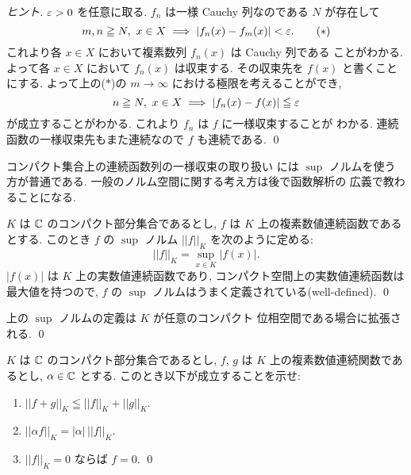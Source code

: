 \documentclass[12pt,twoside]{jarticle}
\begin{document}
\begin{proof}[ヒント]
 $\varepsilon>0$ を任意に取る.
 $f_n$ は一様 Cauchy 列なのである $N$ が存在して 
 \begin{equation*}
  m,n\geqq N,\ x\in X \implies |f_n(x)-f_m(x)|<\varepsilon.
  \tag{$*$}
 \end{equation*}
 これより各 $x\in X$ において複素数列 $f_n(x)$ は Cauchy 列である
 ことがわかる. よって各 $x\in X$ において $f_n(x)$ は収束する.
 その収束先を $f(x)$ と書くことにする.
 よって上の($*$)の $m\to\infty$ における極限を考えることができ, 
 \begin{equation*}
  n\geqq N,\ x\in X \implies |f_n(x)-f(x)|\leqq\eps
 \end{equation*}
 が成立することがわかる. これより $f_n$ は $f$ に一様収束することが
 わかる. 連続函数の一様収束先もまた連続なので $f$ も連続である.
 \qed
\end{proof}

コンパクト集合上の連続函数列の一様収束の取り扱い
には $\sup$ ノルムを使う方が普通である.  
一般のノルム空間に関する考え方は後で函数解析の
広義で教わることになる. 

\begin{definition}
 $K$ は ${\mathbb C}$ のコンパクト部分集合であるとし, 
 $f$ は $K$ 上の複素数値連続函数であるとする.
 このとき $f$ の $\sup$ ノルム $||f||_K$ を次のように定める:
 \begin{equation*}
  ||f||_K = \sup_{x\in K} |f(x)|.
 \end{equation*}
 $|f(x)|$ は $K$ 上の実数値連続函数であり, 
 コンパクト空間上の実数値連続函数は最大値を持つので, %
 $f$ の $\sup$ ノルムはうまく定義されている(well-defined).
 \qed
\end{definition}

\begin{rem}[位相空間について知っている人へ]
 上の $\sup$ ノルムの定義は $K$ が任意のコンパクト
 位相空間である場合に拡張される. \qed
\end{rem}

\begin{question}
 $K$ は ${\mathbb C}$ のコンパクト部分集合であるとし, 
 $f$, $g$ は $K$ 上の複素数値連続関数であるとし, 
 $\alpha\in{\mathbb C}$ とする. このとき以下が成立することを示せ:
 \begin{enumerate}
  \item $||f+g||_K\leqq ||f||_K+||g||_K$.
  \item $||\alpha f||_K = |\alpha|\, ||f||_K$.
  \item $||f||_K=0$ ならば $f=0$.
  \qed
 \end{enumerate}
\end{question}
\end{document}
